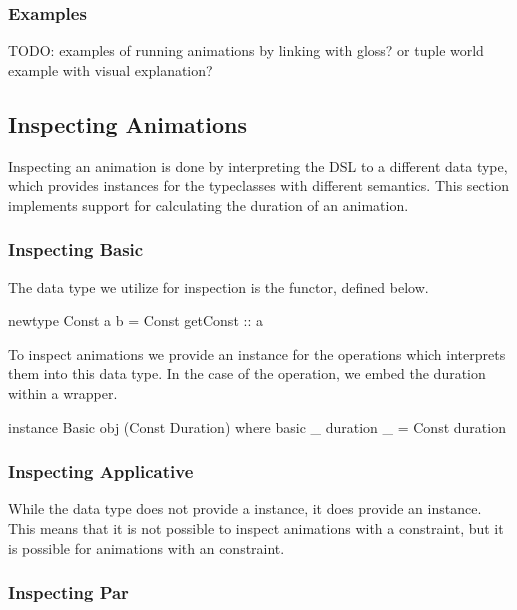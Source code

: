 \subsubsection{Examples}

TODO: examples of running animations by linking with gloss? or tuple world example with visual explanation?

\subsection{Inspecting Animations}

Inspecting an animation is done by interpreting the DSL to a different data type, which provides instances for the typeclasses with different semantics. This section implements support for calculating the duration of an animation.

\subsubsection{Inspecting Basic}

The data type we utilize for inspection is the  functor, defined below.

\begin{spec}
newtype Const a b = Const { getConst :: a }
\end{spec}

To inspect animations we provide an instance for the operations which interprets them into this data type. In the case of the  operation, we embed the duration within a  wrapper.

\begin{code}
instance Basic obj (Const Duration) where
  basic _ duration _ = Const duration
\end{code}

\subsubsection{Inspecting Applicative}

While the  data type does not provide a  instance, it does provide an  instance. This means that it is not possible to inspect animations with a  constraint, but it is possible for animations with an  constraint.

\subsubsection{Inspecting Par}

